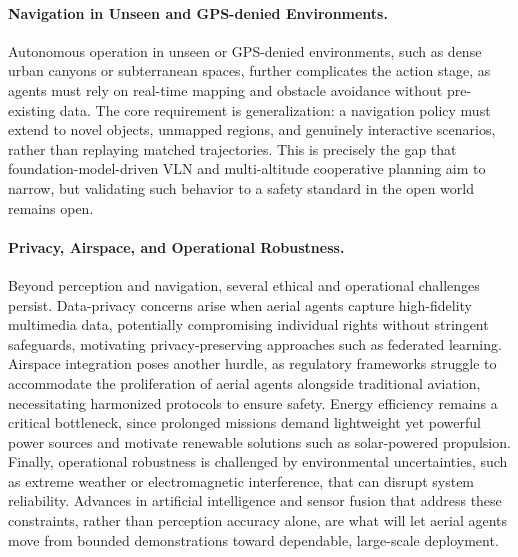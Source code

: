 \paragraph{Navigation in Unseen and GPS-denied Environments.}
Autonomous operation in unseen or GPS-denied environments, such as dense urban canyons or subterranean spaces, further complicates the action stage, as agents must rely on real-time mapping and obstacle avoidance without pre-existing data. The core requirement is generalization: a navigation policy must extend to novel objects, unmapped regions, and genuinely interactive scenarios, rather than replaying matched trajectories. This is precisely the gap that foundation-model-driven VLN and multi-altitude cooperative planning aim to narrow, but validating such behavior to a safety standard in the open world remains open.

\paragraph{Privacy, Airspace, and Operational Robustness.}
Beyond perception and navigation, several ethical and operational challenges persist. Data-privacy concerns arise when aerial agents capture high-fidelity multimedia data, potentially compromising individual rights without stringent safeguards, motivating privacy-preserving approaches such as federated learning. Airspace integration poses another hurdle, as regulatory frameworks struggle to accommodate the proliferation of aerial agents alongside traditional aviation, necessitating harmonized protocols to ensure safety. Energy efficiency remains a critical bottleneck, since prolonged missions demand lightweight yet powerful power sources and motivate renewable solutions such as solar-powered propulsion. Finally, operational robustness is challenged by environmental uncertainties, such as extreme weather or electromagnetic interference, that can disrupt system reliability. Advances in artificial intelligence and sensor fusion that address these constraints, rather than perception accuracy alone, are what will let aerial agents move from bounded demonstrations toward dependable, large-scale deployment.

